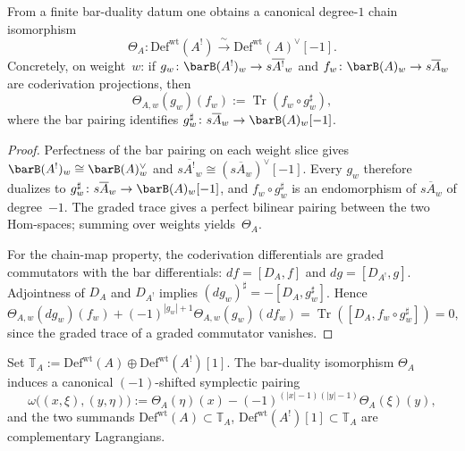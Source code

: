 \begin{theorem}
\label{thm:shifted-rtt-trace-duality}
From a finite bar-duality datum one obtains a canonical degree-$1$
chain isomorphism
\[
\Theta_A \colon \mathrm{Def}^{\mathrm{wt}}(A^!)
\xrightarrow{\;\sim\;}
\mathrm{Def}^{\mathrm{wt}}(A)^\vee[-1].
\]
Concretely, on weight~$w$: if
$g_w \colon \barB(A^!)_w \to s\overline{A^!}_w$ and
$f_w \colon \barB(A)_w \to s\overline{A}_w$ are coderivation
projections, then
\[
\Theta_{A,w}(g_w)(f_w) := \operatorname{Tr}(f_w \circ g_w^{\sharp}),
\]
where the bar pairing identifies
$g_w^{\sharp} \colon s\overline{A}_w \to \barB(A)_w[-1]$.
\end{theorem}

\begin{proof}
Perfectness of the bar pairing on each weight slice gives
$\barB(A^!)_w \cong \barB(A)_w^\vee$ and
$s\overline{A^!}_w \cong (s\overline{A}_w)^\vee[-1]$.
Every $g_w$ therefore dualizes to
$g_w^{\sharp} \colon s\overline{A}_w \to \barB(A)_w[-1]$,
and $f_w \circ g_w^{\sharp}$ is an endomorphism of
$s\overline{A}_w$ of degree~$-1$. The graded trace gives a
perfect bilinear pairing between the two Hom-spaces; summing
over weights yields~$\Theta_A$.

For the chain-map property, the coderivation differentials are
graded commutators with the bar differentials:
$df = [D_A, f]$ and $dg = [D_{A^!}, g]$. Adjointness of
$D_A$ and $D_{A^!}$ implies
$(dg_w)^{\sharp} = -[D_A, g_w^{\sharp}]$. Hence
\[
\Theta_{A,w}(dg_w)(f_w)
+ (-1)^{|g_w|+1}\Theta_{A,w}(g_w)(df_w)
= \operatorname{Tr}([D_A, f_w \circ g_w^{\sharp}]) = 0,
\]
since the graded trace of a graded commutator vanishes.
\end{proof}

\begin{corollary}
\label{cor:shifted-rtt-lagrangian-envelope}
Set
$\mathbb{T}_A := \mathrm{Def}^{\mathrm{wt}}(A) \oplus
\mathrm{Def}^{\mathrm{wt}}(A^!)[1]$.
The bar-duality isomorphism $\Theta_A$ induces a canonical
$(-1)$-shifted symplectic pairing
\[
\omega\bigl((x,\xi),(y,\eta)\bigr)
:= \Theta_A(\eta)(x)
 - (-1)^{(|x|-1)(|y|-1)}\Theta_A(\xi)(y),
\]
and the two summands
$\mathrm{Def}^{\mathrm{wt}}(A) \subset \mathbb{T}_A$,
$\mathrm{Def}^{\mathrm{wt}}(A^!)[1] \subset \mathbb{T}_A$
are complementary Lagrangians.
\end{corollary}

